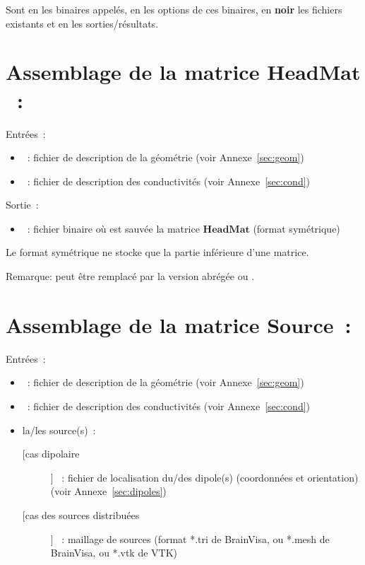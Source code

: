 \noindent
Sont en  les binaires appelés, en  les options de ces binaires, en \textbf{noir}
les fichiers existants et en  les sorties/résultats. 

\section{Assemblage de la matrice $\mathbf{HeadMat}$~:}
\label{sect: command assemble HeadMat}

\noindent
Entrées~: 
\begin{itemize}
    \item {}~: fichier de description de la géométrie (voir Annexe~\ref{sec:geom})
    \item {}~: fichier de description des conductivités (voir Annexe~\ref{sec:cond})
\end{itemize}

\noindent
Sortie~:
\begin{itemize}
    \item {}~: fichier binaire où est sauvée la matrice $\mathbf{HeadMat}$ (format symétrique)
\end{itemize}
Le format symétrique ne stocke que la partie inférieure d'une matrice.
\medskip

\noindent
{}
\medskip
Remarque:  peut être remplacé par la version abrégée  ou .

\section{Assemblage de la matrice $\mathbf{Source}$~:}
\label{sect: command assemble SourceMat}

\noindent
Entrées~: 
\begin{itemize}
    \item {}~: fichier de description de la géométrie (voir Annexe~\ref{sec:geom})
    \item {}~: fichier de description des conductivités (voir Annexe~\ref{sec:cond})
    \item la/les source(s)~:
        \begin{description}
            \item [[cas dipolaire]] ~: fichier de localisation du/des dipole(s) (coordonnées et orientation)
                                    (voir Annexe~\ref{sec:dipoles}) 
            \item [[cas des sources distribuées]]  ~: maillage de sources (format *.tri de BrainVisa, ou *.mesh de BrainVisa, ou *.vtk de VTK) 
        \end{description}
\end{itemize}

